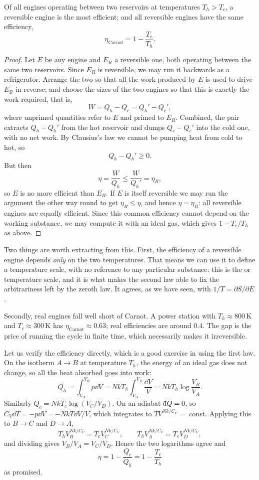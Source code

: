 \documentclass[a4paper]{scrartcl}
\newcommand{\dbar}{\mathchar'26\mkern-11mu \mathrm{d}}
\begin{document}
\begin{theorem}
	Of all engines operating between two reservoirs at temperatures $T_h > T_c$, a reversible engine is the most efficient; and all reversible engines have the same efficiency,
	$$
	\eta_{\mathrm{Carnot}} = 1 - \frac{T_c}{T_h}.
	$$
\end{theorem}
\begin{proof}
	Let $E$ be any engine and $E_R$ a reversible one, both operating between the same two reservoirs. Since $E_R$ is reversible, we may run it backwards as a refrigerator. Arrange the two so that all the work produced by $E$ is used to drive $E_R$ in reverse; and choose the sizes of the two engines so that this is exactly the work required, that is,
	$$
	W = Q_h - Q_c = Q_h' - Q_c',
	$$
	where unprimed quantities refer to $E$ and primed to $E_R$. Combined, the pair extracts $Q_h - Q_h'$ from the hot reservoir and dumps $Q_c - Q_c'$ into the cold one, with no net work. By Clausius's law we cannot be pumping heat from cold to hot, so
	$$
	Q_h - Q_h' \geq 0.
	$$
	But then
	$$
	\eta = \frac{W}{Q_h} \leq \frac{W}{Q_h'} = \eta_R,
	$$
	so $E$ is no more efficient than $E_R$. If $E$ is itself reversible we may run the argument the other way round to get $\eta_R \leq \eta$, and hence $\eta = \eta_R$: all reversible engines are equally efficient. Since this common efficiency cannot depend on the working substance, we may compute it with an ideal gas, which gives $1 - T_c/T_h$ as above.
\end{proof}

Two things are worth extracting from this. First, the efficiency of a reversible engine depends \emph{only} on the two temperatures. That means we can use it to define a temperature scale, with no reference to any particular substance: this is the  or  temperature scale, and it is what makes the second law able to fix the arbitrariness left by the zeroth law. It agrees, as we have seen, with $1/T = \partial S/\partial E$.

Secondly, real engines fall well short of Carnot. A power station with $T_h \approx 800\,\mathrm{K}$ and $T_c \approx 300\,\mathrm{K}$ has $\eta_{\mathrm{Carnot}} \approx 0.63$; real efficiencies are around $0.4$. The gap is the price of running the cycle in finite time, which necessarily makes it irreversible.

\begin{example}
	Let us verify the efficiency directly, which is a good exercise in using the first law. On the isotherm $A\to B$ at temperature $T_h$, the energy of an ideal gas does not change, so all the heat absorbed goes into work:
	$$
	Q_h = \int_{V_A}^{V_B}p\dd V = NkT_h\int_{V_A}^{V_B}\frac{\dd V}{V} = NkT_h\log\frac{V_B}{V_A}.
	$$
	Similarly $Q_c = NkT_c\log(V_C/V_D)$. On an adiabat $\dbar Q = 0$, so $C_V \dd T = -p\dd V = -NkT\dd V/V$, which integrates to $TV^{Nk/C_V} = $ const. Applying this to $B \to C$ and $D \to A$,
	$$
	T_h V_B^{Nk/C_V} = T_c V_C^{Nk/C_V}, \qquad T_h V_A^{Nk/C_V} = T_c V_D^{Nk/C_V},
	$$
	and dividing gives $V_B/V_A = V_C/V_D$. Hence the two logarithms agree and
	$$
	\eta = 1 - \frac{Q_c}{Q_h} = 1 - \frac{T_c}{T_h}
	$$
	as promised.
\end{example}
\end{document}
